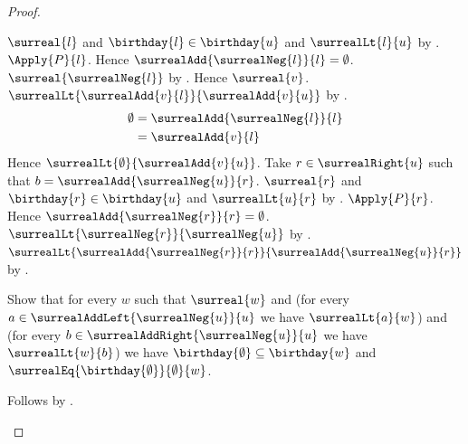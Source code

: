 \begin{proof}
\begin{subproof}
\begin{subproof}
\begin{byCase}
                    $\surreal{l}$ and
                        $\birthday{l}\in\birthday{u}$ and
                        $\surrealLt{l}{u}$
                        by .
                    $\Apply{P}{l}$.
                    Hence $\surrealAdd{\surrealNeg{l}}{l}=\emptyset$.
                    $\surreal{\surrealNeg{l}}$
                        by .
                    Hence $\surreal{v}$.
                    $\surrealLt{\surrealAdd{v}{l}}
                        {\surrealAdd{v}{u}}$
                        by .
                    \begin{align*}
                        \emptyset
                            &= \surrealAdd{\surrealNeg{l}}{l}
                            \\
                            &= \surrealAdd{v}{l}
                    \end{align*}
                    Hence $\surrealLt{\emptyset}{\surrealAdd{v}{u}}$.
                    Take $r\in\surrealRight{u}$ such that
                        $b=\surrealAdd{\surrealNeg{u}}{r}$.
                    $\surreal{r}$ and
                        $\birthday{r}\in\birthday{u}$ and
                        $\surrealLt{u}{r}$
                        by .
                    $\Apply{P}{r}$.
                    Hence $\surrealAdd{\surrealNeg{r}}{r}=\emptyset$.
                    $\surrealLt{\surrealNeg{r}}{\surrealNeg{u}}$
                        by .
                    $\surrealLt{\surrealAdd{\surrealNeg{r}}{r}}
                        {\surrealAdd{\surrealNeg{u}}{r}}$
                        by .
            \end{byCase}
        \end{subproof}
        Show that for every $w$ such that $\surreal{w}$ and
            (for every $a\in\surrealAddLeft{\surrealNeg{u}}{u}$ we have
                $\surrealLt{a}{w}$) and
            (for every $b\in\surrealAddRight{\surrealNeg{u}}{u}$ we have
                $\surrealLt{w}{b}$)
            we have $\birthday{\emptyset}\subseteq\birthday{w}$ and
                $\surrealEq{\birthday{\emptyset}}{\emptyset}{w}$.
        \begin{subproof}
            Follows by .

\end{subproof}
\end{subproof}
\end{proof}
